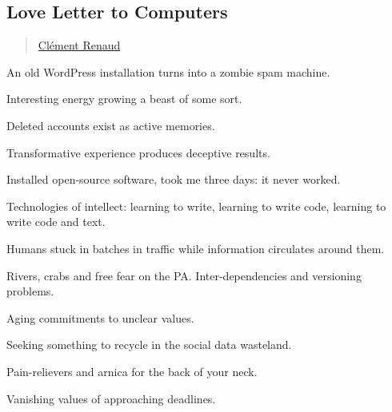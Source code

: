 \subsection{Love Letter to Computers}\label{love-letter-to-computers}

\begin{quote}
\href{../appendix/attributions.html\#clement-renaud}{Clément Renaud}
\end{quote}

An old WordPress installation turns into a zombie spam machine.

Interesting energy growing a beast of some sort.

Deleted accounts exist as active memories.

Transformative experience produces deceptive results.

Installed open-source software, took me three days: it never worked.

Technologies of intellect: learning to write, learning to write code,
learning to write code and text.

Humans stuck in batches in traffic while information circulates around
them.

Rivers, crabs and free fear on the PA. Inter-dependencies and versioning
problems.

Aging commitments to unclear values.

Seeking something to recycle in the social data wasteland.

Pain-relievers and arnica for the back of your neck.

Vanishing values of approaching deadlines.
